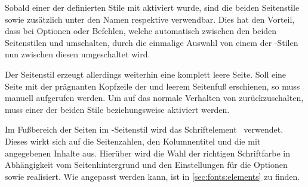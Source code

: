 \begin{Declaration}[v2.02]{}
\begin{Declaration}[v2.02]{}
\begin{Declaration}[v2.02]{}
Sobald einer der definierten Stile mit  
aktiviert wurde, sind die beiden Seitenstile  sowie 
 zusätzlich unter den Namen  
respektive  verwendbar. Dies hat den Vorteil, dass bei 
Optionen oder Befehlen, welche automatisch zwischen den beiden Seitenstilen 
 und  umschalten, durch die einmalige 
Auswahl von einem der -Stilen nun zwischen diesen  
umgeschaltet wird.

Der Seitenstil  erzeugt allerdings weiterhin eine komplett 
leere Seite. Soll eine Seite mit der prägnanten Kopfzeile der \TnUD und leerem 
Seitenfuß erschienen, so muss  
manuell aufgerufen werden. Um auf das normale Verhalten von \KOMAScript{} 
zurückzuschalten, muss einer der beiden Stile  
beziehungsweise  aktiviert werden.

%
\end{Declaration}
\end{Declaration}
\end{Declaration}

\begin{Declaration}[v2.04]{}
\printdeclarationlist%
%
Im Fußbereich der Seiten im -Seitenstil wird das  
Schriftelement~ verwendet. Dieses wirkt sich auf die 
Seitenzahlen, den Kolumnentitel und die mit  angegebenen 
Inhalte aus. Hierüber wird die Wahl der richtigen Schriftfarbe in Abhängigkeit 
vom Seitenhintergrund und den Einstellungen für die Optionen  
sowie  realisiert. Wie  angepasst werden kann, 
ist in \autoref{sec:fonts:elements} zu finden.
\end{Declaration}

